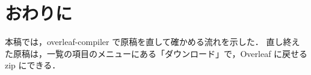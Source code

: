 \section{おわりに}\label{sec:conclusion}

本稿では，overleaf-compiler で原稿を直して確かめる流れを示した．
直し終えた原稿は，一覧の項目のメニューにある「ダウンロード」で，Overleaf に戻せる zip にできる．
